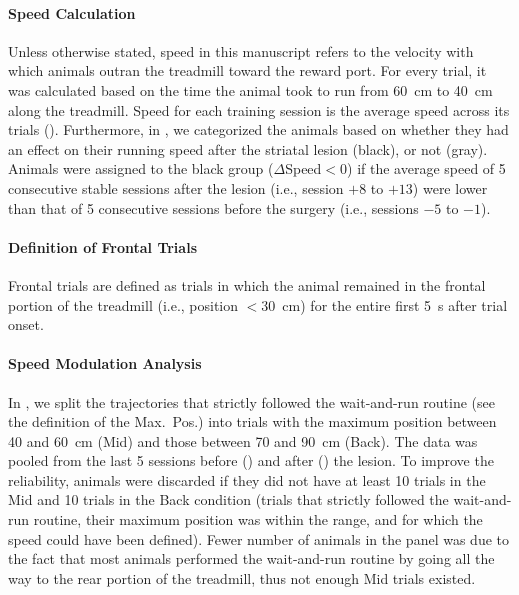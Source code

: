 \paragraph{Speed Calculation}
Unless otherwise stated, speed in this manuscript refers to the velocity with which animals outran the treadmill toward the reward port.
For every trial, it was calculated based on the time the animal took to run from 60~cm to 40~cm along the treadmill.
Speed for each training session is the average speed across its trials ().
Furthermore, in , we categorized the animals based on whether they had an effect on their running speed after the striatal lesion (black), or not (gray).
Animals were assigned to the black group ($\Delta$Speed$<0$) if the average speed of 5 consecutive stable sessions after the lesion (i.e., session $+8$ to $+13$) were lower than that of 5 consecutive sessions before the surgery (i.e., sessions $-5$ to $-1$).


\paragraph{Definition of Frontal Trials}
Frontal trials are defined as trials in which the animal remained in the frontal portion of the treadmill (i.e., position $<30$~cm) for the entire first 5~s after trial onset.


\paragraph{Speed Modulation Analysis}
In , we split the trajectories that strictly followed the wait-and-run routine (see the definition of the Max.\ Pos.) into trials with the maximum position between 40 and 60~cm (Mid) and those between 70 and 90~cm (Back).
The data was pooled from the last 5 sessions before () and after () the lesion.
To improve the reliability, animals were discarded if they did not have at least 10 trials in the Mid and 10 trials in the Back condition (trials that strictly followed the wait-and-run routine, their maximum position was within the range, and for which the speed could have been defined).
Fewer number of animals in the  panel was due to the fact that most animals performed the wait-and-run routine by going all the way to the rear portion of the treadmill, thus not enough Mid trials existed.


